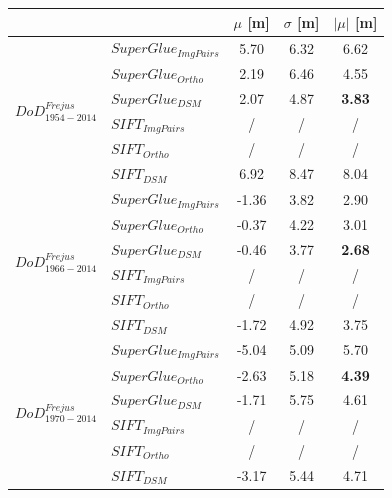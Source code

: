 \begin{table}%
	\footnotesize
	\centering
	\begin{tabular}{||l|l|c|c|c||}\hline
		& &$\mu$ [m]&$\sigma$ [m]&$|\mu|$ [m]\\\hline\hline
		\multirow{6}{*}{$DoD^{Frejus}_{1954-2014}$}
		&${SuperGlue_{ImgPairs}}$ & 5.70 & 6.32 & 6.62\\
		&${SuperGlue_{Ortho}}$ & 2.19 & 6.46 & 4.55\\
		&${SuperGlue_{DSM}}$ & 2.07 & 4.87 & \textbf{3.83} \\
		&${SIFT_{ImgPairs}}$ & / & / & / \\
		&${SIFT_{Ortho}}$ & / & / & / \\
		&${SIFT_{DSM}}$ & 6.92 & 8.47 & 8.04\\\hline
		
		\multirow{6}{*}{$DoD^{Frejus}_{1966-2014}$}
		&${SuperGlue_{ImgPairs}}$ & -1.36 & 3.82 & 2.90\\
		&${SuperGlue_{Ortho}}$ & -0.37 & 4.22 & 3.01\\
		&${SuperGlue_{DSM}}$ & -0.46 & 3.77 & \textbf{2.68}\\
		&${SIFT_{ImgPairs}}$ & / & / & / \\
		&${SIFT_{Ortho}}$ & / & / & / \\
		&${SIFT_{DSM}}$ & -1.72 & 4.92 & 3.75\\\hline
		
		\multirow{6}{*}{$DoD^{Frejus}_{1970-2014}$}
		&${SuperGlue_{ImgPairs}}$ & -5.04 & 5.09 & 5.70\\
		&${SuperGlue_{Ortho}}$ & -2.63 & 5.18 & \textbf{4.39}\\
		&${SuperGlue_{DSM}}$ & -1.71 & 5.75 & 4.61\\
		&${SIFT_{ImgPairs}}$ & / & / & / \\
		&${SIFT_{Ortho}}$ & / & / & / \\
		&${SIFT_{DSM}}$ & -3.17 & 5.44 & 4.71\\\hline
		

\end{tabular}
\end{table}
